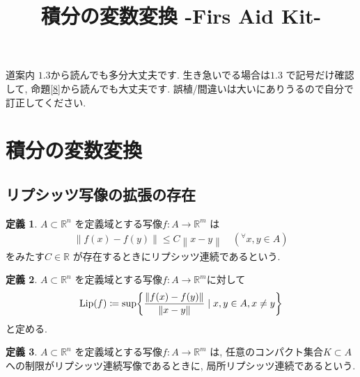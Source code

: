 \documentclass[twocolumn, landscape, a4paper , 8pt, fleqn, titlepage ]{jsarticle}
\title{積分の変数変換 -Firs Aid Kit-}
\author{}
\date{}
\theoremstyle{definition}
\newtheorem{dfn}{定義}[section]
\newcommand{\any}{{}^{\forall}}
\newcommand{\cbra}[1]{\mleft\{#1\mright\}}
\newcommand{\norm}[1]{\left\|#1\right\|}
\newcommand{\Lip}[1]{\textrm{Lip}(#1)}
\renewcommand{\-}{\hyphen}
\begin{document}
\maketitle

\scriptsize 

\begin{itembox}[l]{道案内}
$1.3$から読んでも多分大丈夫です. 生き急いでる場合は$1.3$ で記号だけ確認して, 命題\ref{8}から読んでも大丈夫です. 誤植/間違いは大いにありうるので自分で訂正してください.
\end{itembox}

\section{積分の変数変換}
\subsection{リプシッツ写像の拡張の存在}
\begin{dfn}
$A \subset \mathbb R^n$ を定義域とする写像$f: A \rightarrow \mathbb R^m$ は
\begin{align*} \norm{f(x) - f(y)} \leq C \norm{x - y} \quad (\any x,y \in A)\end{align*}
をみたす$C \in \mathbb R$ が存在するときにリプシッツ連続であるという. 
\end{dfn}

\begin{dfn}$A\subset \mathbb R^n$ を定義域とする写像$f: A \rightarrow \mathbb R ^m$に対して
\begin{align*} \Lip f \coloneqq \sup \cbra{ \frac{\norm{f(x) - f(y)}}{\norm{x - y}  }   \mid x, y \in A , x \neq y}\end{align*}
と定める. 
\end{dfn}

\begin{dfn}\label{1}
$A \subset \mathbb R^n$ を定義域とする写像$f: A \rightarrow \mathbb R^m$ は, 任意のコンパクト集合$K \subset A$への制限がリプシッツ連続写像であるときに, 局所リプシッツ連続であるという. 
\end{dfn}
\end{document}
